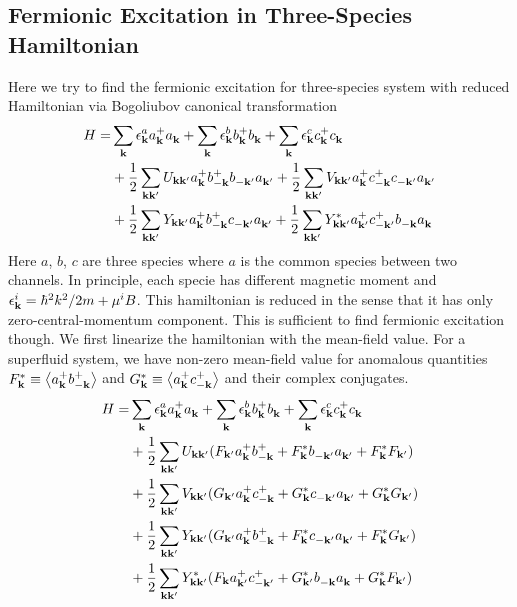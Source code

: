 \subsection{Fermionic Excitation in Three-Species Hamiltonian}
Here we try to find the fermionic excitation for three-species system with reduced Hamiltonian via Bogoliubov canonical transformation\cite{Tinkham}
\begin{equation}\label{eq:threeReducedHamiltonian}
\begin{split}
 H=&\sum_{\mathbf{k}}\epsilon^a_{\mathbf{k}}{}a^+_{\mathbf{k}}{}a^{}_{\mathbf{k}}+\sum_{\mathbf{k}}\epsilon^b_{\mathbf{k}}{}b^+_{\mathbf{k}}{}b^{}_{\mathbf{k}}+\sum_{\mathbf{k}}\epsilon^c_{\mathbf{k}}{}c^+_{\mathbf{k}}{}c^{}_{\mathbf{k}}\\
  &+\frac{1}{2}\sum_{\mathbf{k}\mathbf{k}'}U_{\mathbf{k}\mathbf{k}'}a^+_{\mathbf{k}}{}b^+_{-\mathbf{k}}{}b^{}_{-\mathbf{k}'}a^{}_{\mathbf{k}'}
	+\frac{1}{2}\sum_{\mathbf{k}\mathbf{k}'}V_{\mathbf{k}\mathbf{k}'}a^+_{\mathbf{k}}{}c^+_{-\mathbf{k}}{}c^{}_{-\mathbf{k}'}a^{}_{\mathbf{k}'}\\
 &+\frac{1}{2}\sum_{\mathbf{k}\mathbf{k}'}Y_{\mathbf{k}\mathbf{k}'}a^+_{\mathbf{k}}{}b^+_{-\mathbf{k}}{}c^{}_{-\mathbf{k}'}a^{}_{\mathbf{k}'}
	+\frac{1}{2}\sum_{\mathbf{k}\mathbf{k}'}Y^*_{\mathbf{k}\mathbf{k}'}a^+_{\mathbf{k}'}{}c^+_{-\mathbf{k}'}{}b^{}_{-\mathbf{k}}a^{}_{\mathbf{k}}
\end{split} 
\end{equation}
Here $a$, $b$, $c$ are three species where $a$ is the common species between two channels. In principle, each specie has different magnetic moment and $\epsilon^{i}_{\mathbf{k}}=\hbar^{2}k^{2}/2m+\mu^{i}B$. This hamiltonian is reduced in the sense that it has only zero-central-momentum component.  This is sufficient to find fermionic excitation though.  We first linearize the hamiltonian with the mean-field value. For a superfluid system, we have non-zero mean-field value for anomalous quantities $F^{*}_{\mathbf{k}}\equiv\bigl<{a^+_{\mathbf{k}}{}b^+_{-\mathbf{k}}{}}\bigr>$ and $G^{*}_{\mathbf{k}}\equiv\bigl<{a^+_{\mathbf{k}}{}c^+_{-\mathbf{k}}{}}\bigr>$ and their complex conjugates. 
\begin{equation}
\begin{split}
 H=&\sum_{\mathbf{k}}\epsilon^a_{\mathbf{k}}{}a^+_{\mathbf{k}}{}a^{}_{\mathbf{k}}+\sum_{\mathbf{k}}\epsilon^b_{\mathbf{k}}{}b^+_{\mathbf{k}}{}b^{}_{\mathbf{k}}+\sum_{\mathbf{k}}\epsilon^c_{\mathbf{k}}{}c^+_{\mathbf{k}}{}c^{}_{\mathbf{k}}\\
  &+\frac{1}{2}\sum_{\mathbf{k}\mathbf{k}'}U_{\mathbf{k}\mathbf{k}'}(F_{\mathbf{k}'}a^+_{\mathbf{k}}{}b^+_{-\mathbf{k}}{}+F^{*}_{\mathbf{k}}{}b^{}_{-\mathbf{k}'}a^{}_{\mathbf{k}'}+F_{\mathbf{k}}^{*}F_{\mathbf{k}'})\\
	&+\frac{1}{2}\sum_{\mathbf{k}\mathbf{k}'}V_{\mathbf{k}\mathbf{k}'}(G_{\mathbf{k}'}a^+_{\mathbf{k}}{}c^+_{-\mathbf{k}}{}+G^{*}_{\mathbf{k}}c^{}_{-\mathbf{k}'}a^{}_{\mathbf{k}'}+G_{\mathbf{k}}^{*}G_{\mathbf{k}'})\\
 &+\frac{1}{2}\sum_{\mathbf{k}\mathbf{k}'}Y_{\mathbf{k}\mathbf{k}'}(G_{\mathbf{k}'}a^+_{\mathbf{k}}{}b^+_{-\mathbf{k}}{}+F^{*}_{\mathbf{k}}c^{}_{-\mathbf{k}'}a^{}_{\mathbf{k}'}+F_{\mathbf{k}}^{*}G_{\mathbf{k}'})\\
	&+\frac{1}{2}\sum_{\mathbf{k}\mathbf{k}'}Y^*_{\mathbf{k}\mathbf{k}'}(F_{\mathbf{k}}a^+_{\mathbf{k}'}{}c^+_{-\mathbf{k}'}{}+G^{*}_{\mathbf{k}'}b^{}_{-\mathbf{k}}a^{}_{\mathbf{k}}+G_{\mathbf{k}}^{*}F_{\mathbf{k}'})
\end{split} 
\end{equation}

